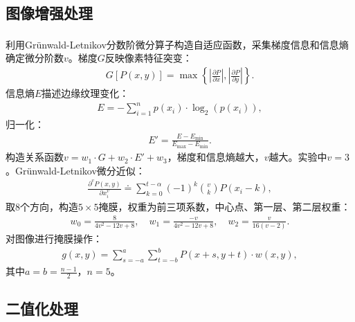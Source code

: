 \documentclass{whutmod}
\newcommand{\upcite}[1]{\textsuperscript{\cite{#1}}}
\begin{document}
        \subsection{图像增强处理}
            利用Grünwald-Letnikov分数阶微分算子\upcite{5}构造自适应函数，采集梯度信息和信息熵确定微分阶数$v$。梯度$G$反映像素特征突变：
            \begin{gather}
                G[P(x,y)] = \max \left\{ \left| \frac{\partial P}{\partial x} \right|, \left| \frac{\partial P}{\partial y} \right| \right\}.
            \end{gather}
            信息熵$E$描述边缘纹理变化：
            \begin{gather}
                E = -\sum_{i=1}^{n} p(x_i) \cdot \log_2(p(x_i)),
            \end{gather}
            归一化：
            \begin{gather}
                E' = \frac{E - E_{\min}}{E_{\max} - E_{\min}}.
            \end{gather}
            构造关系函数$v = w_1 \cdot G + w_2 \cdot E' + w_3$，梯度和信息熵越大，$v$越大。实验中$v=3$。Grünwald-Letnikov微分近似：
            \begin{gather}
                \frac{\partial^v P(x,y)}{\partial x_i^v} \doteq \sum_{k=0}^{t-\alpha} (-1)^k \binom{v}{k} P(x_i - k),
            \end{gather}
            取8个方向，构造$5 \times 5$掩膜，权重为前三项系数，中心点、第一层、第二层权重：
            \begin{gather*}
                w_0 = \frac{8}{4v^2 - 12v + 8}, \quad w_1 = \frac{-v}{4v^2 - 12v + 8}, \quad w_2 = \frac{v}{16(v-2)}.
            \end{gather*}
            对图像进行掩膜操作：
            \begin{gather}
                g(x,y) = \sum_{s=-a}^{a} \sum_{t=-b}^{b} P(x+s, y+t) \cdot w(x,y),
            \end{gather}
            其中$a = b = \frac{n-1}{2}$，$n=5$。

        \subsection{二值化处理}
\end{document}
